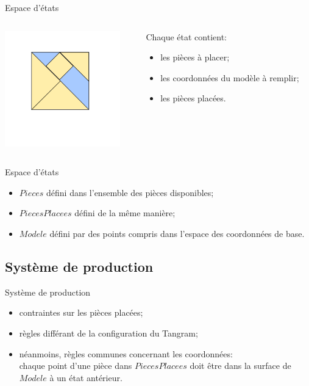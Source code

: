 \documentclass{beamer}
\begin{document}
\begin{frame}{Espace d'états}

	\begin{columns}[c]
		\begin{column}{4cm}
    		\includegraphics[width=5cm]{representation_sousfigure}
  		\end{column}
		\begin{column}{6.5cm}
			Chaque état contient:
			\begin{itemize}
				\item les pièces à placer;
				\item les coordonnées du modèle à remplir;
				\item les pièces placées.
			\end{itemize}
  		\end{column}
	\end{columns}

\end{frame}

\begin{frame}{Espace d'états}

	\begin{itemize}
		\item $Pieces$ défini dans l'ensemble des pièces disponibles;
		 \item $PiecesPlacees$ défini de la même manière;
		 \item $Modele$ défini par des points compris dans l'espace des coordonnées de base.
	\end{itemize}

\end{frame}

		
		\subsection{Système de production}
		
\begin{frame}{Système de production}

	\begin{itemize}
		\item contraintes sur les pièces placées;
		\item règles différant de la configuration du Tangram;
		\item néanmoins, règles communes concernant les coordonnées:\\
		chaque point d'une pièce dans $PiecesPlacees$ doit être dans la surface de $Modele$ à un état antérieur.
	\end{itemize}

\end{frame}
\end{document}
